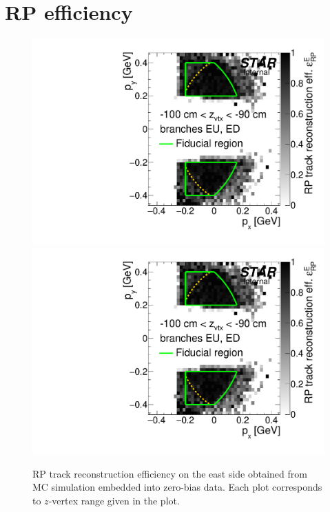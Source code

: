 
\chapter{RP efficiency}\label{appendix:rpEff}

\begin{figure}[hb]
\caption[RP track reconstruction efficiency on the east (MC embedded into zero-bias data).]{RP track reconstruction efficiency on the east side obtained from MC simulation embedded into zero-bias data. Each plot corresponds to $z$-vertex range given in the plot.}\label{fig:rpEffE}
\centering
\parbox{0.495\textwidth}{
  \centering
  \includegraphics[width=\linewidth,page=3]{graphics/corrections/mcFullEffPxPy.pdf}\\
  \includegraphics[width=\linewidth,page=5]{graphics/corrections/mcFullEffPxPy.pdf}
}
\end{figure}
